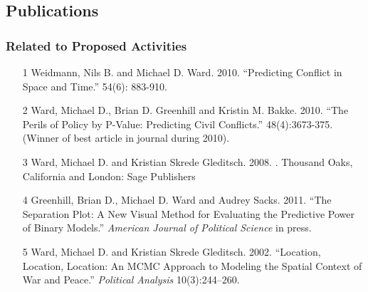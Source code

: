\documentclass[pdftex,12pt,fullpage,oneside]{amsart}
\begin{document}
\subsection*{Publications}
\subsubsection*{Related to Proposed Activities}
\begin{itemize}

\item[1] Weidmann, Nils B. and Michael D. Ward. 2010. ``Predicting
  Conflict in Space and Time.''  54(6): 883-910.

\item[2] Ward, Michael D., Brian D. Greenhill and Kristin
  M. Bakke. 2010. ``The Perils of Policy by P-Value: Predicting Civil
  Conflicts.'' 
  48(4):3673-375. (Winner of best article in journal during 2010).

\item[3] Ward, Michael D. and Kristian Skrede
  Gleditsch. 2008. . Thousand Oaks, California and London: Sage Publishers

\item[4] Greenhill, Brian D., Michael D. Ward and Audrey
  Sacks. 2011. ``The Separation Plot: A New Visual Method for
  Evaluating the Predictive Power of Binary Models.'' \newblock
  {\textit{American Journal of Political Science}} in press.

\item[5] Ward, Michael D. and Kristian Skrede
  Gleditsch. 2002. ``Location, Location, Location: An MCMC Approach to
  Modeling the Spatial Context of War and Peace.'' \newblock
  {\textit{Political Analysis}} 10(3):244--260.
\end{itemize}
\end{document}
